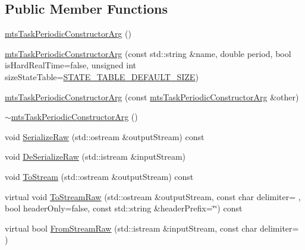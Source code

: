 \subsection*{Public Member Functions}
\begin{DoxyCompactItemize}
\item 
\hyperlink{classmts_task_periodic_constructor_arg_a859ff291bf47192285f9ab515ce03056}{mts\+Task\+Periodic\+Constructor\+Arg} ()
\item 
\hyperlink{classmts_task_periodic_constructor_arg_aab112f4d4f81df67d60dd9283bfd6374}{mts\+Task\+Periodic\+Constructor\+Arg} (const std\+::string \&name, double period, bool is\+Hard\+Real\+Time=false, unsigned int size\+State\+Table=\hyperlink{classmts_task_periodic_constructor_arg_a26e076204c3149fe911725c21e2a0e94a636d05314de683eba7b7c31f0627f5cb}{S\+T\+A\+T\+E\+\_\+\+T\+A\+B\+L\+E\+\_\+\+D\+E\+F\+A\+U\+L\+T\+\_\+\+S\+I\+Z\+E})
\item 
\hyperlink{classmts_task_periodic_constructor_arg_aa42f9007a3d15d0d6c37d6129149d405}{mts\+Task\+Periodic\+Constructor\+Arg} (const \hyperlink{classmts_task_periodic_constructor_arg}{mts\+Task\+Periodic\+Constructor\+Arg} \&other)
\item 
\hyperlink{classmts_task_periodic_constructor_arg_afe25fce7a682ee2a4be36cd63249e8b9}{$\sim$mts\+Task\+Periodic\+Constructor\+Arg} ()
\item 
void \hyperlink{classmts_task_periodic_constructor_arg_accdba07a3168373637092903d6c415fd}{Serialize\+Raw} (std\+::ostream \&output\+Stream) const 
\item 
void \hyperlink{classmts_task_periodic_constructor_arg_a42a52417233307de92b780e9f9beaf7f}{De\+Serialize\+Raw} (std\+::istream \&input\+Stream)
\item 
void \hyperlink{classmts_task_periodic_constructor_arg_addfcb27fe5ad37e6c1ab6dad37b7e120}{To\+Stream} (std\+::ostream \&output\+Stream) const 
\item 
virtual void \hyperlink{classmts_task_periodic_constructor_arg_a4820a784c730fdb160090b77675485e8}{To\+Stream\+Raw} (std\+::ostream \&output\+Stream, const char delimiter= \textquotesingle{} \textquotesingle{}, bool header\+Only=false, const std\+::string \&header\+Prefix=\char`\"{}\char`\"{}) const 
\item 
virtual bool \hyperlink{classmts_task_periodic_constructor_arg_a95bf0bdf04e064a9c94246948c895ed2}{From\+Stream\+Raw} (std\+::istream \&input\+Stream, const char delimiter= \textquotesingle{} \textquotesingle{})
\end{DoxyCompactItemize}
